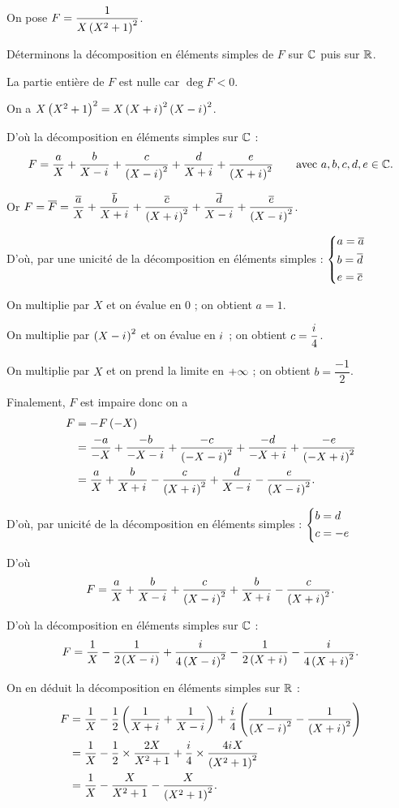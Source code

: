 \begin{ex}
On pose \(F=\dfrac{1}{X\left(X^2+1\right)^2}\).

Déterminons la décomposition en éléments simples de \(F\) sur \(\mathbb{C}\) puis sur \(\mathbb{R}\).

La partie entière de \(F\) est nulle car \(\deg F<0\).

On a \(X\left(X^2+1\right)^2=X\left(X+i\mkern1mu\right)^2\left(X-i\mkern1mu\right)^2\).

D'où la décomposition en éléments simples sur \(\mathbb{C}\) : \[F=\dfrac{a}{X}+\dfrac{b}{X-i\mkern1mu}+\dfrac{c}{\left(X-i\mkern1mu\right)^2}+\dfrac{d}{X+i\mkern1mu}+\dfrac{e}{\left(X+i\mkern1mu\right)^2}\qquad\text{avec }a,b,c,d,e\in\mathbb{C}.\]

Or \(F=\overline{F}=\dfrac{\overline{a}}{X}+\dfrac{\overline{b}}{X+i\mkern1mu}+\dfrac{\overline{c}}{\left(X+i\mkern1mu\right)^2}+\dfrac{\overline{d}}{X-i\mkern1mu}+\dfrac{\overline{e}}{\left(X-i\mkern1mu\right)^2}\).

D'où, par une unicité de la décomposition en éléments simples : \(\begin{dcases}a=\overline{a} \\ b=\overline{d} \\ e=\overline{c}\end{dcases}\)

On multiplie par \(X\) et on évalue en \(0\) ; on obtient \(a=1\).

On multiplie par \(\left(X-i\mkern1mu\right)^2\) et on évalue en \(i\mkern1mu\) ; on obtient \(c=\dfrac{i\mkern1mu}{4}\).

On multiplie par \(X\) et on prend la limite en \(+\infty\) ; on obtient \(b=\dfrac{-1}{2}\).

Finalement, \(F\) est impaire donc on a \[\begin{aligned}
F&=-F\left(-X\right) \\
&=\dfrac{-a}{-X}+\dfrac{-b}{-X-i\mkern1mu}+\dfrac{-c}{\left(-X-i\mkern1mu\right)^2}+\dfrac{-d}{-X+i\mkern1mu}+\dfrac{-e}{\left(-X+i\mkern1mu\right)^2} \\
&=\dfrac{a}{X}+\dfrac{b}{X+i\mkern1mu}-\dfrac{c}{\left(X+i\mkern1mu\right)^2}+\dfrac{d}{X-i\mkern1mu}-\dfrac{e}{\left(X-i\mkern1mu\right)^2}.
\end{aligned}\]

D'où, par unicité de la décomposition en éléments simples : \(\begin{dcases}b=d \\ c=-e\end{dcases}\)

D'où \[F=\dfrac{a}{X}+\dfrac{b}{X-i\mkern1mu}+\dfrac{c}{\left(X-i\mkern1mu\right)^2}+\dfrac{b}{X+i\mkern1mu}-\dfrac{c}{\left(X+i\mkern1mu\right)^2}.\]

D'où la décomposition en éléments simples sur \(\mathbb{C}\) : \[F=\dfrac{1}{X}-\dfrac{1}{2\left(X-i\mkern1mu\right)}+\dfrac{i\mkern1mu}{4\left(X-i\mkern1mu\right)^2}-\dfrac{1}{2\left(X+i\mkern1mu\right)}-\dfrac{i\mkern1mu}{4\left(X+i\mkern1mu\right)^2}.\]

On en déduit la décomposition en éléments simples sur \(\mathbb{R}\) : \[\begin{aligned}
F&=\dfrac{1}{X}-\dfrac{1}{2}\left(\dfrac{1}{X+i\mkern1mu}+\dfrac{1}{X-i\mkern1mu}\right)+\dfrac{i\mkern1mu}{4}\left(\dfrac{1}{\left(X-i\mkern1mu\right)^2}-\dfrac{1}{\left(X+i\mkern1mu\right)^2}\right) \\
&=\dfrac{1}{X}-\dfrac{1}{2}\times\dfrac{2X}{X^2+1}+\dfrac{i\mkern1mu}{4}\times\dfrac{4i\mkern1mu X}{\left(X^2+1\right)^2} \\
&=\dfrac{1}{X}-\dfrac{X}{X^2+1}-\dfrac{X}{\left(X^2+1\right)^2}.
\end{aligned}\]
\end{ex}


